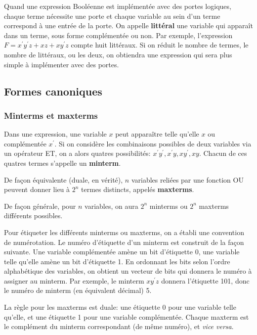 \documentclass[11pt]{article}
\begin{document}
Quand une expression Booléenne est implémentée avec des portes
logiques, chaque terme nécessite une porte et chaque variable au sein
d'un terme correspond à une entrée de la porte. On appelle \textbf{littéral}
une variable qui apparaît dans un terme, sous forme complémentée ou
non. Par exemple, l'expression \(F = x^\prime y^\prime z + xz +
xy^\prime z\) compte huit littéraux. Si on réduit le nombre de
termes, le nombre de littéraux, ou les deux, on obtiendra une
expression qui sera plus simple à implémenter avec des portes.

\subsection{Formes canoniques}
\label{sec:orged58a1f}

\subsubsection{Minterms et maxterms}
\label{sec:org00fdc9f}

Dans une expression, une variable \(x\) peut apparaître telle qu'elle
\(x\) ou complémentée \(x^\prime\). Si on considère les combinaisons
possibles de deux variables via un opérateur ET, on a alors quatres
possibilités: \(x^\prime y^\prime, x^\prime y, x y^\prime,x
y\). Chacun de ces quatres termes s'appelle un \textbf{minterm}.

De façon équivalente (duale, en vérité), \(n\) variables reliées par
une fonction OU peuvent donner lieu à \(2^n\) termes distincts,
appelés \textbf{maxterms}. 

De façon générale, pour \(n\) variables, on aura \(2^n\) minterms ou
\(2^n\) maxterms différents possibles.

Pour étiqueter les différents minterms ou maxterms, on a établi une
convention de numérotation. Le numéro d'étiquette d'un minterm est
construit de la façon suivante. Une variable complémentée amène un bit
d'étiquette 0, une variable telle qu'elle amène un bit d'étiquette 1.
En ordonnant les bits selon l'ordre alphabétique des variables, on
obtient un vecteur de bits qui donnera le numéro à assigner au
minterm.  Par exemple, le minterm \(x y^\prime z\) donnera l'étiquette
101, donc le numéro de minterm (en équivalent décimal) 5.

La règle pour les maxterms est duale: une étiquette 0 pour une
variable telle qu'elle, et une étiquette 1 pour une variable
complémentée. Chaque maxterm est le complément du minterm
correspondant (de même numéro), et \emph{vice versa}.
\end{document}
